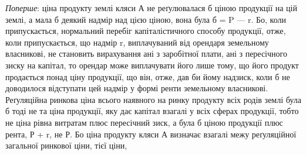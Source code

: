 \emph{Поперше}: ціна продукту землі кляси А не реґулювалася б ціною продукції
на цій землі, а мала б деякий надмір над цією ціною, вона була б =
P — r. Бо, коли припускається, нормальний перебіг капіталістичного способу
продукції, отже, коли припускається, що надмір r, виплачуваний від орендаря
земельному власникові, не становить вирахування ані з заробітної плати, ані
з пересічного зиску на капітал, то орендар може виплачувати його лише тому,
що його продукт продається понад ціну продукції, що він, отже, дав би йому
надзиск, коли б не доводилося відступати цей надмір у формі ренти земельному
власникові. Реґуляційна ринкова ціна всього наявного на ринку продукту
всіх родів землі була б тоді не та ціна продукції, яку дає капітал взагалі
у всіх сферах продукції, тобто не ціна рівна витратам плюс пересічний
зиск, а була б ціною продукції плюс рента, Р + r, не Р. Бо ціна продукту
кляси А визначає взагалі межу реґуляційної загальної ринкової ціни, тієї ціни,
\parbreak{}  %
